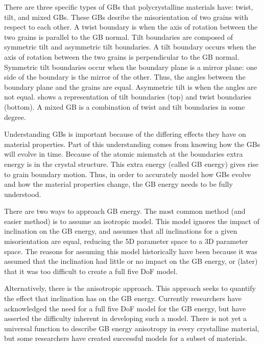 \documentclass[12pt]{report}
\begin{document}
There are three specific types of GBs that polycrystalline materials have: twist, tilt, and mixed GBs.\cite{lejcek2010, rohrer2011}  These GBs desribe the misorientation of two grains with respect to each other.  A twist boundary is when the axis of rotation between the two grains is parallel to the GB normal.  Tilt boundaries are composed of symmetric tilt and asymmetric tilt boundaries.  A tilt boundary occurs when the axis of rotation between the two grains is perpendicular to the GB normal.  Symmetric tilt boundaries occur when the boundary plane is a mirror plane: one side of the boundary is the mirror of the other.  Thus, the angles between the boundary plane and the grains are equal. Asymmetric tilt is when the angles are not equal.   shows a representation of tilt boundaries (top) and twist boundaries (bottom).  A mixed GB is a combination of twist and tilt boundaries in some degree.

Understanding GBs is important because of the differing effects they have on material properties.\cite{patala2013, homer2015, bulatov2014}  Part of this understanding comes from knowing how the GBs will evolve in time.  Because of the atomic mismatch at the boundaries extra energy is in the crystal structure.  This extra energy (called GB energy) gives rise to grain boundary motion.  Thus, in order to accurately model how GBs evolve and how the material properties change, the GB energy needs to be fully understood.

There are two ways to approach GB energy.  The most common method (and easier method) is to assume an isotropic model.  This model ignores the impact of inclination on the GB energy, and assumes that all inclinations for a given misorientation are equal, reducing the 5D parameter space to a 3D parameter space.  The reasons for assuming this model historically have been because it was assumed that the inclination had little or no impact on the GB energy, or (later) that it was too difficult to create a full five DoF model.\cite{homer2015}

Alternatively, there is the anisotropic approach.  This approach seeks to quantify the effect that inclination has on the GB energy.  Currently researchers have acknowledged the need for a full five DoF model for the GB energy, but have asserted the difficulty inherent in developing such a model.\cite{rohrer2011, lejcek2010, homer2015}  There is not yet a universal function to describe GB energy anisotropy in every crystalline material, but some researchers\cite{bulatov2014} have created successful models for a subset of materials.
\end{document}
